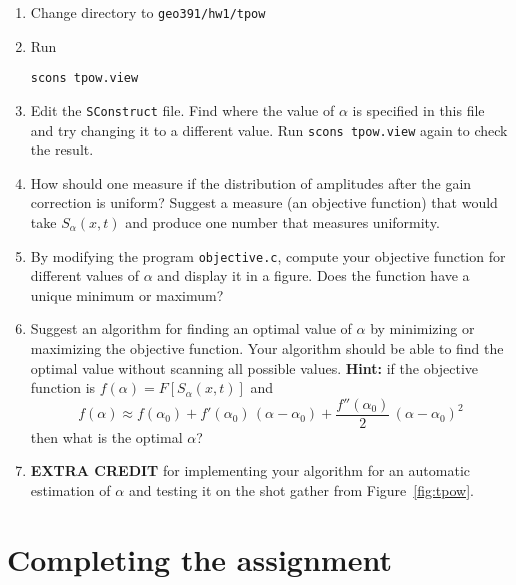 \begin{enumerate}
\item Change directory to \verb#geo391/hw1/tpow#
\item Run
\begin{verbatim}
scons tpow.view
\end{verbatim}
\item Edit the \texttt{SConstruct} file. Find where the value of
  $\alpha$ is specified in this file and try changing it to a
  different value. Run \texttt{scons tpow.view} again to check the result.
\item How should one measure if the distribution of amplitudes after
  the gain correction is uniform? Suggest a measure (an objective
  function) that would take $S_\alpha(x,t)$ and produce one number that
  measures uniformity.
\item By modifying the program \texttt{objective.c}, compute your objective 
  function for different values of $\alpha$ and display it in a figure. 
  Does the function have a unique minimum or maximum?

\lstset{language=c,numbers=left,numberstyle=\tiny,showstringspaces=false}


\item Suggest an algorithm for finding an optimal value of $\alpha$ by
  minimizing or maximizing the objective function. Your algorithm
  should be able to find the optimal value without scanning all
  possible values. \textbf{Hint:} if the objective function is
  $f(\alpha)=F[S_\alpha(x,t)]$ and 
\begin{equation}
\label{alpha}                      
f(\alpha) \approx f(\alpha_0) + 
  f'(\alpha_0)\,(\alpha-\alpha_0) + \frac{f''(\alpha_0)}{2}\,(\alpha-\alpha_0)^2
\end{equation}
then what is the optimal $\alpha$?
\item \textbf{EXTRA CREDIT} for implementing your algorithm for an automatic 
estimation of $\alpha$ and testing it on the shot gather from
Figure~\ref{fig:tpow}.

\end{enumerate}

\lstset{language=python,numbers=left,numberstyle=\tiny,showstringspaces=false}


\newpage

\section{Completing the assignment}

